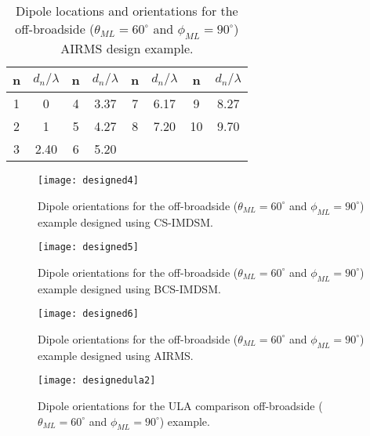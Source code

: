 \documentclass[10pt,final]{IEEEtran}
\begin{document}
\begin{table}
\caption{\rm Dipole locations and orientations for the off-broadside ($\theta_{ML}=60^{\circ}$ and $\phi_{ML}=90^{\circ}$) AIRMS design example.} \centering
\begin{tabular}{|c|c|c|c|c|c|c|c|}\hline
n  & $d_{n}/\lambda$ &  n & $d_{n}/\lambda$ &  n & $d_{n}/\lambda$ & n & $d_{n}/\lambda$\\
\hline
1  & 0   &  4 &   3.37   &  7 &  6.17  & 9 & 8.27 \\
\hline
2  &1  &  5  &   4.27   &  8 &  7.20  & 10 & 9.70 \\
\hline
3  & 2.40 &   6  &   5.20    \\
\cline{1-4}
\end{tabular}
\label{tb:reweightedoffbroad}
\end{table}

\begin{figure}
\begin{center}
   \texttt{[image: designed4]}
   \caption{Dipole orientations for the off-broadside ($\theta_{ML}=60^{\circ}$ and $\phi_{ML}=90^{\circ}$) example designed using CS-IMDSM.
    \label{fig:designed4}}
\end{center}
\end{figure}
\begin{figure}
\begin{center}
   \texttt{[image: designed5]}
   \caption{Dipole orientations for the off-broadside ($\theta_{ML}=60^{\circ}$ and $\phi_{ML}=90^{\circ}$) example designed using BCS-IMDSM.
    \label{fig:designed5}}
\end{center}
\end{figure}
\begin{figure}
\begin{center}
   \texttt{[image: designed6]}
   \caption{Dipole orientations for the off-broadside ($\theta_{ML}=60^{\circ}$ and $\phi_{ML}=90^{\circ}$) example designed using AIRMS.
    \label{fig:designed6}}
\end{center}
\end{figure}
\begin{figure}
\begin{center}
   \texttt{[image: designedula2]}
   \caption{Dipole orientations for the ULA comparison off-broadside ($\theta_{ML}=60^{\circ}$ and $\phi_{ML}=90^{\circ}$) example.
    \label{fig:designedula2}}
\end{center}
\end{figure}
\end{document}
